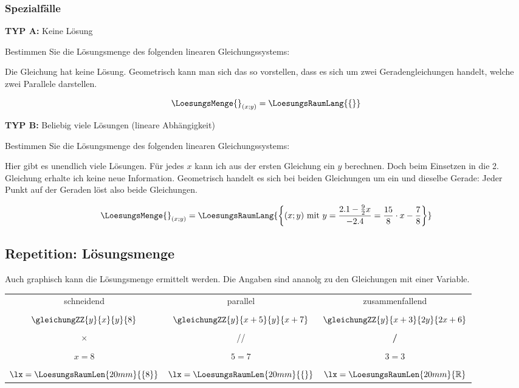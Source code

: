 \subsubsection{Spezialfälle}
\textbf{TYP A:} Keine Lösung

Bestimmen Sie die Lösungsmenge des folgenden linearen Gleichungssystems:


Die Gleichung hat keine Lösung. Geometrisch kann man sich das so vorstellen, dass es sich um zwei Geradengleichungen handelt, welche zwei Parallele darstellen.

$$\LoesungsMenge{}_{(x;y)} = \LoesungsRaumLang{\{\}}$$

\textbf{TYP B:} Beliebig viele Lösungen (lineare Abhängigkeit)

Bestimmen Sie die Lösungsmenge des folgenden linearen Gleichungssystems:


Hier gibt es unendlich viele Lösungen. Für jedes $x$ kann ich aus der ersten Gleichung ein $y$ berechnen. Doch beim Einsetzen in die 2. Gleichung erhalte ich keine neue Information.
Geometrisch handelt es sich bei beiden Gleichungen um ein und dieselbe Gerade: Jeder Punkt auf der Geraden löst also beide Gleichungen.

$$\LoesungsMenge{}_{(x;y)} = \LoesungsRaumLang{
\left\{(x;y) \text{ mit } y = \frac{2.1-\frac92x}{-2.4} =  \frac{15}{8} \cdot{} x - \frac78\right\} }$$

\newpage

\subsection*{Repetition: Lösungsmenge}
Auch graphisch kann die Lösungsmenge ermittelt werden. Die Angaben
sind ananolg zu den Gleichungen mit einer Variable.
\begin{center}
\begin{tabular}{c|c|c}
schneidend                 & parallel      &
zusammenfallend\\
 & & \\
\vspace{0.5mm}
$\gleichungZZ{y}{x}{y}{8}$ & $\gleichungZZ{y}{x+5}{y}{x+7}$ & $\gleichungZZ{y}{x+3}{2y}{2x+6}$   \\
 & & \\
$\times$                   & //            &   \textbf{/}      \\
 & & \\
$x=8$                      & $5=7$         &  $3=3$            \\
 & & \\
$\lx=\LoesungsRaumLen{20mm}{\{8\}}$                & $\lx=\LoesungsRaumLen{20mm}{\{\}}$    &  $\lx=\LoesungsRaumLen{20mm}{\mathbb{R}}$ \\
\end{tabular} 
\end{center}

